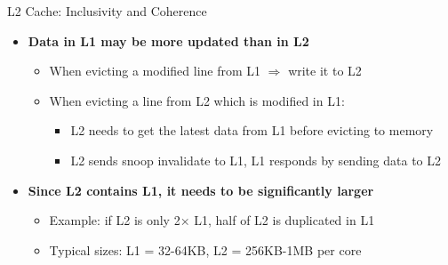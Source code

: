 \documentclass[aspectratio=169,12pt]{beamer}
\begin{document}
\begin{frame}{L2 Cache: Inclusivity and Coherence}
  \begin{itemize}
    \item \textbf{Data in L1 may be more updated than in L2}
    \begin{itemize}
      \item When evicting a modified line from L1 $\Rightarrow$ write it to L2
      \item When evicting a line from L2 which is modified in L1:
      \begin{itemize}
        \item L2 needs to get the latest data from L1 before evicting to memory
        \item L2 sends snoop invalidate to L1, L1 responds by sending data to L2
      \end{itemize}
    \end{itemize}
    
    \vspace{0.5cm}
    
    \item \textbf{Since L2 contains L1, it needs to be significantly larger}
    \begin{itemize}
      \item Example: if L2 is only 2× L1, half of L2 is duplicated in L1
      \item Typical sizes: L1 = 32-64KB, L2 = 256KB-1MB per core
    \end{itemize}
  \end{itemize}
\end{frame}
\end{document}
